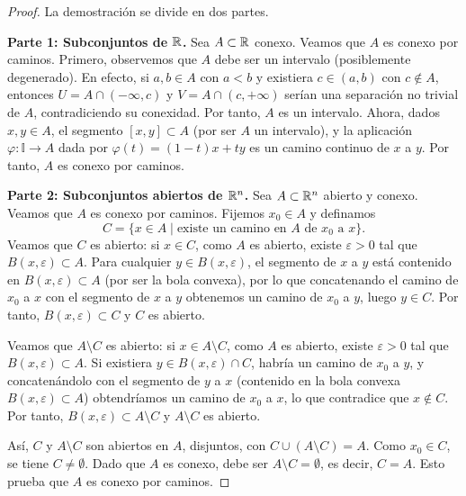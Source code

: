 \begin{proof}
    La demostración se divide en dos partes.

    \textbf{Parte 1: Subconjuntos de $\mathbb{R}$.} Sea $A \subset \mathbb{R}$ conexo. Veamos que $A$ es conexo por caminos. Primero, observemos que $A$ debe ser un intervalo (posiblemente degenerado). En efecto, si $a, b \in A$ con $a < b$ y existiera $c \in (a, b)$ con $c \notin A$, entonces $U = A \cap (-\infty, c)$ y $V = A \cap (c, +\infty)$ serían una separación no trivial de $A$, contradiciendo su conexidad. Por tanto, $A$ es un intervalo. Ahora, dados $x, y \in A$, el segmento $[x, y] \subset A$ (por ser $A$ un intervalo), y la aplicación $\varphi \colon \mathbb{I} \to A$ dada por $\varphi(t) = (1-t)x + ty$ es un camino continuo de $x$ a $y$. Por tanto, $A$ es conexo por caminos.

    \textbf{Parte 2: Subconjuntos abiertos de $\mathbb{R}^n$.} Sea $A \subset \mathbb{R}^n$ abierto y conexo. Veamos que $A$ es conexo por caminos. Fijemos $x_0 \in A$ y definamos
    $$C = \{x \in A \mid \text{existe un camino en } A \text{ de } x_0 \text{ a } x\}.$$
    Veamos que $C$ es abierto: si $x \in C$, como $A$ es abierto, existe $\varepsilon > 0$ tal que $B(x, \varepsilon) \subset A$. Para cualquier $y \in B(x, \varepsilon)$, el segmento de $x$ a $y$ está contenido en $B(x, \varepsilon) \subset A$ (por ser la bola convexa), por lo que concatenando el camino de $x_0$ a $x$ con el segmento de $x$ a $y$ obtenemos un camino de $x_0$ a $y$, luego $y \in C$. Por tanto, $B(x, \varepsilon) \subset C$ y $C$ es abierto.

    Veamos que $A \setminus C$ es abierto: si $x \in A \setminus C$, como $A$ es abierto, existe $\varepsilon > 0$ tal que $B(x, \varepsilon) \subset A$. Si existiera $y \in B(x, \varepsilon) \cap C$, habría un camino de $x_0$ a $y$, y concatenándolo con el segmento de $y$ a $x$ (contenido en la bola convexa $B(x, \varepsilon) \subset A$) obtendríamos un camino de $x_0$ a $x$, lo que contradice que $x \notin C$. Por tanto, $B(x, \varepsilon) \subset A \setminus C$ y $A \setminus C$ es abierto.

    Así, $C$ y $A \setminus C$ son abiertos en $A$, disjuntos, con $C \cup (A \setminus C) = A$. Como $x_0 \in C$, se tiene $C \neq \emptyset$. Dado que $A$ es conexo, debe ser $A \setminus C = \emptyset$, es decir, $C = A$. Esto prueba que $A$ es conexo por caminos.
\end{proof}

